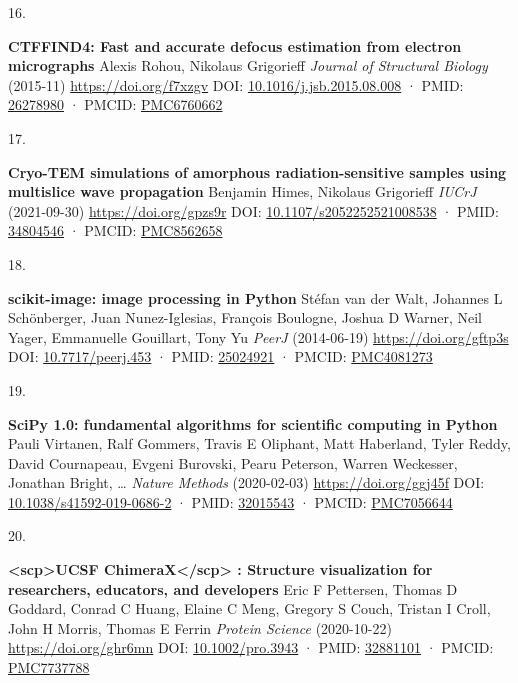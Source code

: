\documentclass[
]{article}
\newlength{\cslhangindent}
\newlength{\csllabelwidth}
\newlength{\cslentryspacingunit} %
\newenvironment{CSLReferences}[2] %
 {%
  \setlength{\parindent}{0pt}
  \ifodd #1
  \let\oldpar\par
  \def\par{\hangindent=\cslhangindent\oldpar}
  \fi
  \setlength{\parskip}{#2\cslentryspacingunit}
 }%
 {}
\newcommand{\CSLBlock}[1]{#1\hfill\break}
\newcommand{\CSLLeftMargin}[1]{\parbox[t]{\csllabelwidth}{#1}}
\newcommand{\CSLRightInline}[1]{\parbox[t]{\linewidth - \csllabelwidth}{#1}\break}
\begin{document}
\begin{CSLReferences}{0}{0}
\leavevmode{}%
\CSLLeftMargin{16. }%
\CSLRightInline{\textbf{CTFFIND4: Fast and accurate defocus estimation from electron micrographs}
\CSLBlock{Alexis Rohou, Nikolaus Grigorieff} \emph{Journal of Structural Biology} (2015-11) \url{https://doi.org/f7xzgv}
\CSLBlock{DOI: \href{https://doi.org/10.1016/j.jsb.2015.08.008}{10.1016/j.jsb.2015.08.008} · PMID: \href{https://www.ncbi.nlm.nih.gov/pubmed/26278980}{26278980} · PMCID: \href{https://www.ncbi.nlm.nih.gov/pmc/articles/PMC6760662}{PMC6760662}}}

\leavevmode{}%
\CSLLeftMargin{17. }%
\CSLRightInline{\textbf{Cryo-TEM simulations of amorphous radiation-sensitive samples using multislice wave propagation}
\CSLBlock{Benjamin Himes, Nikolaus Grigorieff} \emph{IUCrJ} (2021-09-30) \url{https://doi.org/gpzs9r}
\CSLBlock{DOI: \href{https://doi.org/10.1107/s2052252521008538}{10.1107/s2052252521008538} · PMID: \href{https://www.ncbi.nlm.nih.gov/pubmed/34804546}{34804546} · PMCID: \href{https://www.ncbi.nlm.nih.gov/pmc/articles/PMC8562658}{PMC8562658}}}

\leavevmode{}%
\CSLLeftMargin{18. }%
\CSLRightInline{\textbf{scikit-image: image processing in Python}
\CSLBlock{Stéfan van der Walt, Johannes L Schönberger, Juan Nunez-Iglesias, François Boulogne, Joshua D Warner, Neil Yager, Emmanuelle Gouillart, Tony Yu} \emph{PeerJ} (2014-06-19) \url{https://doi.org/gftp3s}
\CSLBlock{DOI: \href{https://doi.org/10.7717/peerj.453}{10.7717/peerj.453} · PMID: \href{https://www.ncbi.nlm.nih.gov/pubmed/25024921}{25024921} · PMCID: \href{https://www.ncbi.nlm.nih.gov/pmc/articles/PMC4081273}{PMC4081273}}}

\leavevmode{}%
\CSLLeftMargin{19. }%
\CSLRightInline{\textbf{SciPy 1.0: fundamental algorithms for scientific computing in Python}
\CSLBlock{Pauli Virtanen, Ralf Gommers, Travis E Oliphant, Matt Haberland, Tyler Reddy, David Cournapeau, Evgeni Burovski, Pearu Peterson, Warren Weckesser, Jonathan Bright, \ldots{} } \emph{Nature Methods} (2020-02-03) \url{https://doi.org/ggj45f}
\CSLBlock{DOI: \href{https://doi.org/10.1038/s41592-019-0686-2}{10.1038/s41592-019-0686-2} · PMID: \href{https://www.ncbi.nlm.nih.gov/pubmed/32015543}{32015543} · PMCID: \href{https://www.ncbi.nlm.nih.gov/pmc/articles/PMC7056644}{PMC7056644}}}

\leavevmode{}%
\CSLLeftMargin{20. }%
\CSLRightInline{\textbf{\textless scp\textgreater UCSF ChimeraX\textless/scp\textgreater{}
: Structure visualization for researchers, educators, and developers}
\CSLBlock{Eric F Pettersen, Thomas D Goddard, Conrad C Huang, Elaine C Meng, Gregory S Couch, Tristan I Croll, John H Morris, Thomas E Ferrin} \emph{Protein Science} (2020-10-22) \url{https://doi.org/ghr6mn}
\CSLBlock{DOI: \href{https://doi.org/10.1002/pro.3943}{10.1002/pro.3943} · PMID: \href{https://www.ncbi.nlm.nih.gov/pubmed/32881101}{32881101} · PMCID: \href{https://www.ncbi.nlm.nih.gov/pmc/articles/PMC7737788}{PMC7737788}}}


\end{CSLReferences}
\end{document}
